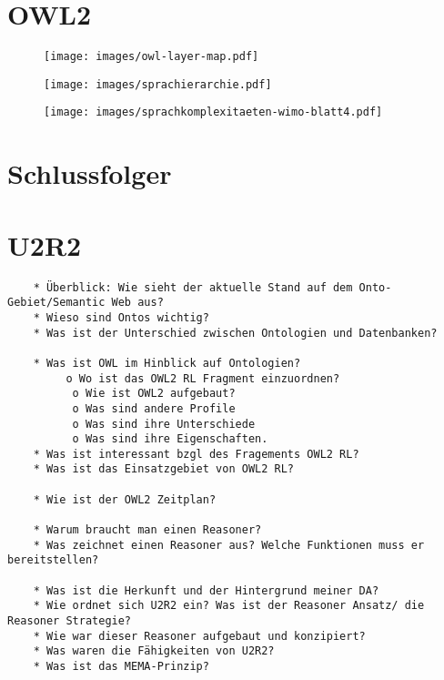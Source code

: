 \section{OWL2}
\begin{figure}
\texttt{[image: images/owl-layer-map.pdf]}
\end{figure}

\begin{figure}
\texttt{[image: images/sprachierarchie.pdf]}
\end{figure}

\begin{figure}
\texttt{[image: images/sprachkomplexitaeten-wimo-blatt4.pdf]}
\end{figure}

\section{Schlussfolger}

\section{U2R2}

\begin{verbatim}
    * Überblick: Wie sieht der aktuelle Stand auf dem Onto-Gebiet/Semantic Web aus?
    * Wieso sind Ontos wichtig?
    * Was ist der Unterschied zwischen Ontologien und Datenbanken? 
    
    * Was ist OWL im Hinblick auf Ontologien?
         o Wo ist das OWL2 RL Fragment einzuordnen?
          o Wie ist OWL2 aufgebaut?
          o Was sind andere Profile
          o Was sind ihre Unterschiede
          o Was sind ihre Eigenschaften.
    * Was ist interessant bzgl des Fragements OWL2 RL?
    * Was ist das Einsatzgebiet von OWL2 RL?
    
    * Wie ist der OWL2 Zeitplan?
    
    * Warum braucht man einen Reasoner?
    * Was zeichnet einen Reasoner aus? Welche Funktionen muss er bereitstellen?
    
    * Was ist die Herkunft und der Hintergrund meiner DA?
    * Wie ordnet sich U2R2 ein? Was ist der Reasoner Ansatz/ die Reasoner Strategie?
    * Wie war dieser Reasoner aufgebaut und konzipiert?
    * Was waren die Fähigkeiten von U2R2?
    * Was ist das MEMA-Prinzip?
    
    
\end{verbatim}
